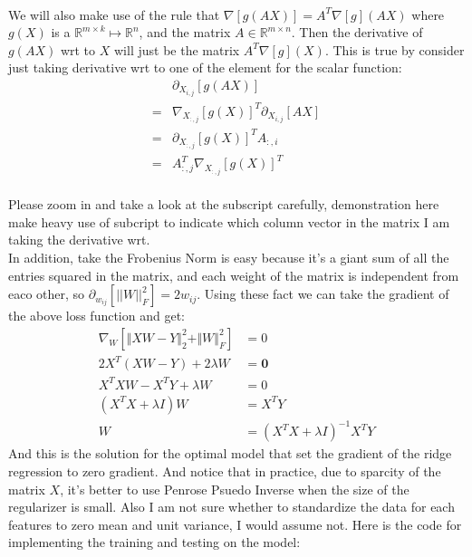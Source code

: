 \documentclass[]{article}
\begin{document}
        \\
        We will also make use of the rule that $\nabla [g(AX)] = A^T\nabla[g](AX)$ where $g(X)$ is a $\mathbb{R}^{m\times k}\mapsto \mathbb{R}^{n}$, and the matrix $A\in \mathbb{R}^{m\times n}$. Then the derivative of $g(AX)$ wrt to $X$ will just be the matrix $A^T\nabla[g](X)$. This is true by consider just taking derivative wrt to one of the element for the scalar function:
        \begin{align*}\tag{A.6.1.1}\label{eqn:A.6.1.1}
            &\partial_{X_{i, j}}[g(AX)] 
            \\
            =& 
            \nabla_{X_{:, j}}[g(X)]^T\partial_{X_{i, j}}[AX]
            \\
            =&
            \partial_{X_{:, j}}[g(X)]^TA_{:, i}
            \\
            =& 
            A_{:, j}^T\nabla_{X_{:, j}}[g(X)]^T
        \end{align*}
        \\
        Please zoom in and take a look at the subscript carefully, demonstration here make heavy use of subcript to indicate which column vector in the matrix I am taking the derivative wrt. 
        \\
        In addition, take the Frobenius Norm is easy because it's a giant sum of all the entries squared in the matrix, and each weight of the matrix is independent from eaco other, so $\partial_{w_{ij}}[||W||_F^2] = 2w_{ij}$. Using these fact we can take the gradient of the above loss function and get: 
        \begin{align*}\tag{A.6.2}\label{eqn:A.6.2}
            \nabla_W \left[
                \Vert XW  - Y\Vert_2^2 + \Vert W\Vert_F^2
            \right] &= 0
            \\
            2X^T(XW - Y) + 2\lambda W &= \mathbf{0}
            \\
            X^TXW - X^TY + \lambda W &= 0 
            \\
            (X^TX + \lambda I)W &= X^TY
            \\
            W &= (X^TX + \lambda I)^{-1}X^TY
        \end{align*}
        And this is the solution for the optimal model that set the gradient of the ridge regression to zero gradient. And notice that in practice, due to sparcity of the matrix $X$, it's better to use Penrose Psuedo Inverse when the size of the regularizer is small. Also I am not sure whether to standardize the data for each features to zero mean and unit variance, I would assume not. Here is the code for implementing the training and testing on the model: 
\end{document}
